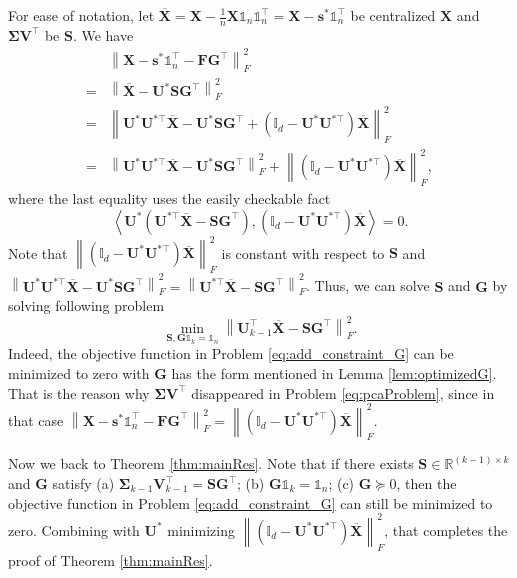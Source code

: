 \documentclass[journal]{IEEEtran}
\begin{document}
For ease of notation, let $\overline{\mathbf{X}}=\mathbf{X} - \frac{1}{n}\mathbf{X}\mathbb{1}_n\mathbb{1}_n^\top = \mathbf{X}-\mathbf{s}^*\mathbb{1}_n^\top$ be centralized $\mathbf{X}$ and $\mathbf{\Sigma V}^\top$ be $\mathbf{S}$. We have
\[
\begin{aligned}
&\left\| \mathbf{X} - \mathbf{s}^*\mathbb{1}_n^\top - \mathbf{F}\mathbf{G}^\top \right\|_F^2 \\
=& \left\| \overline{\mathbf{X}} - \mathbf{U}^*\mathbf{S}\mathbf{G}^\top \right\|_F^2 \\
=& \left\| \mathbf{U}^*\mathbf{U}^{*\top} \overline{\mathbf{X}} - \mathbf{U}^*\mathbf{S}\mathbf{G}^\top + \left(\mathbb{I}_{d}-\mathbf{U}^*\mathbf{U}^{*\top}\right) \overline{\mathbf{X}} \right\|_F^2 \\
=& \left\| \mathbf{U}^*\mathbf{U}^{*\top} \overline{\mathbf{X}} - \mathbf{U}^*\mathbf{S}\mathbf{G}^\top \right\|_F^2 + \left\| \left(\mathbb{I}_{d}-\mathbf{U}^*\mathbf{U}^{*\top}\right) \overline{\mathbf{X}} \right\|_F^2,
\end{aligned}
\]
where the last equality uses the easily checkable fact 
\[
\left\langle  \mathbf{U}^*(\mathbf{U}^{*\top} \overline{\mathbf{X}} - \mathbf{S}\mathbf{G}^\top), (\mathbb{I}_{d}-\mathbf{U}^*\mathbf{U}^{*\top}) \overline{\mathbf{X}} \right\rangle = 0.
\]
Note that $ \left\| \left(\mathbb{I}_{d}-\mathbf{U}^*\mathbf{U}^{*\top}\right) \overline{\mathbf{X}} \right\|_F^2$ is constant with respect to $\mathbf{S}$ and $\left\| \mathbf{U}^*\mathbf{U}^{*\top} \overline{\mathbf{X}} - \mathbf{U}^*\mathbf{S}\mathbf{G}^\top \right\|_F^2 = \left\|\mathbf{U}^{*\top} \overline{\mathbf{X}} - \mathbf{S}\mathbf{G}^\top \right\|_F^2$.
Thus, we can solve $\mathbf{S}$ and $\mathbf{G}$ by solving following problem
\begin{equation}\label{eq:add_constraint_G}
\min_{\mathbf{S},\mathbf{G}\mathbb{1}_k = \mathbb{1}_n} \left\|\mathbf{U}_{k-1}^\top \overline{\mathbf{X}} - \mathbf{S}\mathbf{G}^\top \right\|_F^2.
\end{equation}
Indeed, the objective function in Problem \eqref{eq:add_constraint_G} can be minimized to zero with $\mathbf{G}$ has the form mentioned in Lemma 
\ref{lem:optimizedG}.
That is the reason why $\mathbf{\Sigma V}^\top$ disappeared in Problem \eqref{eq:pcaProblem}, since in that case $\left\| \mathbf{X} - \mathbf{s}^*\mathbb{1}_n^\top - \mathbf{F}\mathbf{G}^\top \right\|_F^2=\left\| \left(\mathbb{I}_{d}-\mathbf{U}^*\mathbf{U}^{*\top}\right) \overline{\mathbf{X}} \right\|_F^2$.

Now we back to Theorem \ref{thm:mainRes}.
Note that if there exists $\mathbf{S}\in\mathbb{R}^{(k-1)\times k}$ and $\mathbf{G}$ satisfy (a) $\mathbf{\Sigma}_{k-1}\mathbf{V}_{k-1}^\top = \mathbf{S}\mathbf{G}^\top$; (b) $\mathbf{G}\mathbb{1}_k = \mathbb{1}_n$; (c) $\mathbf{G} \succeq 0$,
then the objective function in Problem \eqref{eq:add_constraint_G} can still be minimized to zero.
Combining with $\mathbf{U}^*$ minimizing $\left\| \left(\mathbb{I}_{d}-\mathbf{U}^*\mathbf{U}^{*\top}\right) \overline{\mathbf{X}} \right\|_F^2$, that completes the proof of Theorem \ref{thm:mainRes}.
\end{document}
